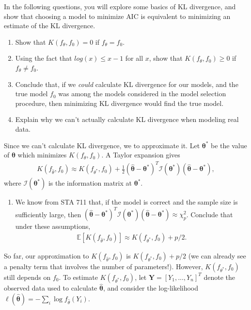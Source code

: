 \documentclass[11pt]{article}
\begin{document}
\noindent In the following questions, you will explore some basics of KL divergence, and show that choosing a model to minimize AIC is equivalent to minimizing an estimate of the KL divergence.

\begin{enumerate}
\item Show that $K(f_\theta, f_0) = 0$ if $f_\theta = f_0$.

\item Using the fact that $log(x) \leq x - 1$ for all $x$, show that $K(f_\theta, f_0) \geq 0$ if $f_\theta \neq f_0$.

\item Conclude that, if we \textit{could} calculate KL divergence for our models, and the true model $f_0$ was among the models considered in the model selection procedure, then minimizing KL divergence would find the true model.

\item Explain why we can't actually calculate KL divergence when modeling real data.
\end{enumerate}

\noindent Since we can't calculate KL divergence, we to approximate it. Let $\bm{\theta}^*$ be the value of $\bm{\theta}$ which minimizes $K(f_\theta, f_0)$. A Taylor expansion gives
\begin{align}
K(f_{\widehat{\theta}}, f_0) \approx K(f_{\theta^*}, f_0) + \frac{1}{2} (\widehat{\bm{\theta}} - \bm{\theta}^*)^T \mathcal{I}(\bm{\theta}^*) (\widehat{\bm{\theta}} - \bm{\theta}^*),
\end{align}
where $\mathcal{I}(\bm{\theta}^*)$ is the information matrix at $\bm{\theta}^*$.

\begin{enumerate}
\item We know from STA 711 that, if the model is correct and the sample size is sufficiently large, then $(\widehat{\bm{\theta}} - \bm{\theta}^*)^T \mathcal{I}(\bm{\theta}^*) (\widehat{\bm{\theta}} - \bm{\theta}^*) \approx \chi^2_p$. Conclude that under these assumptions,
\begin{align}
\mathbb{E}[K(f_{\widehat{\theta}}, f_0)] \approx K(f_{\theta^*}, f_0) + p/2.
\end{align}
\end{enumerate}

\noindent So far, our approximation to $K(f_{\widehat{\theta}}, f_0)$ is $K(f_{\theta^*}, f_0) + p/2$ (we can already see a penalty term that involves the number of parameters!). However, $K(f_{\theta^*}, f_0)$ still depends on $f_0$. To estimate $K(f_{\theta^*}, f_0)$, let $\bm{Y} = [Y_1,...,Y_n]^T$ denote the observed data used to calculate $\widehat{\bm{\theta}}$, and consider the log-likelihood $\ell(\widehat{\bm{\theta}}) = -\sum_i \log f_{\widehat{\theta}}(Y_i)$.
\end{document}
